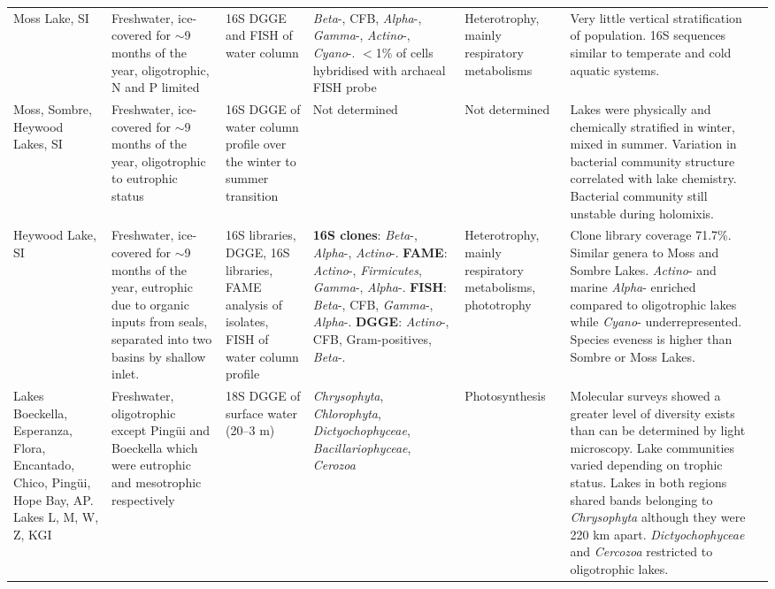 \begin{landscape}
\begin{longtable}{p{2.5cm}p{3.5cm}p{2cm}p{3cm}p{2.5cm}p{5.5cm}p{3.5cm}}
Moss Lake, SI & Freshwater, ice-covered for $\sim$9 months of the year, oligotrophic, N and P limited & 16S DGGE and FISH of water column & \emph{Beta}-, CFB, \emph{Alpha}-, \emph{Gamma}-, \emph{Actino}-, \emph{Cyano}-. $<$1\% of cells hybridised with archaeal FISH probe & Heterotrophy, mainly respiratory metabolisms & Very little vertical stratification of population. 16S sequences similar to temperate and cold aquatic systems. & \cite{Pearce2003b} \\

Moss, Sombre, Heywood Lakes, SI & Freshwater, ice-covered for $\sim$9 months of the year, oligotrophic to eutrophic status  & 16S \acs{DGGE} of water column profile over the winter to summer transition & Not determined & Not determined & Lakes were physically and chemically stratified in winter, mixed in summer. Variation in bacterial community structure correlated with lake chemistry. Bacterial community still unstable during holomixis. & \cite{Pearce2005a} \\

Heywood Lake, SI & Freshwater, ice-covered for $\sim$9 months of the year, eutrophic due to organic inputs from seals, separated into two basins by shallow inlet. & 16S libraries, \acs{DGGE}, 16S libraries, FAME analysis of isolates, FISH of water column profile  & \textbf{16S clones}: \emph{Beta}-, \emph{Alpha}-, \emph{Actino}-. \textbf{FAME}: \emph{Actino}-, \emph{Firmicutes}, \emph{Gamma}-, \emph{Alpha}-. \textbf{FISH}: \emph{Beta}-, CFB, \emph{Gamma}-, \emph{Alpha}-. \textbf{\acs{DGGE}}: \emph{Actino}-, CFB, Gram-positives, \emph{Beta}-. & Heterotrophy, mainly respiratory metabolisms, phototrophy & Clone library coverage 71.7\%. Similar genera to Moss and Sombre Lakes. \emph{Actino}- and marine \emph{Alpha}- enriched compared to oligotrophic lakes while \emph{Cyano}- underrepresented. Species eveness is higher than Sombre or Moss Lakes. & \cite{Pearce2005b} \\

Lakes Boeckella, Esperanza, Flora, Encantado, Chico, Ping\"{u}i, Hope Bay, AP. Lakes L, M, W, Z, KGI & Freshwater, oligotrophic except Ping\"{u}i and Boeckella which were eutrophic and mesotrophic respectively & 18S \acs{DGGE} of surface water (20--3 \textmu{}m) & \emph{Chrysophyta}, \emph{Chlorophyta}, \emph{Dictyochophyceae}, \emph{Bacillariophyceae}, \emph{Cerozoa} & Photosynthesis & Molecular surveys showed a greater level of diversity exists than can be determined by light microscopy. Lake communities varied depending on trophic status. Lakes in both regions shared bands belonging to \emph{Chrysophyta} although they were 220 km apart. \emph{Dictyochophyceae} and \emph{Cercozoa} restricted to oligotrophic lakes. & \cite{Unrein2005} \\


\end{longtable}
\end{landscape}
